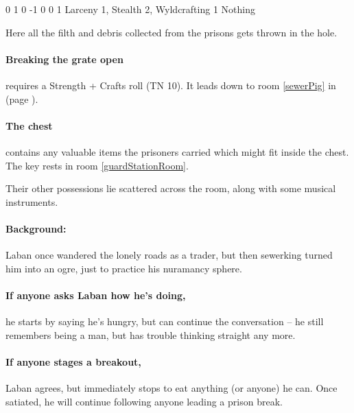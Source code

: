 \begin{multicols}{2}
{0}%
{1}%
{{0}%
{-1}%
{0}}%
{0}%
{1}%
{Larceny 1, Stealth 2, Wyldcrafting 1}%
{Nothing}%
{}


Here all the filth and debris collected from the prisons gets thrown in the hole.

\paragraph{Breaking the grate open}
requires a Strength + Crafts roll (TN 10).
It leads down to room \ref{sewerPig} in \lowercase{} (page \pageref{sewerPig}).


\paragraph{The chest}
contains any valuable items the prisoners carried which might fit inside the chest.
The key rests in room \ref{guardStationRoom}.

Their other possessions lie scattered across the room, along with some musical instruments.


\paragraph{Background:}
Laban once wandered the lonely roads as a trader, but then \Gls{sewerking} turned him into an ogre, just to practice his nuramancy sphere.

\paragraph{If anyone asks Laban how he's doing,}
he starts by saying he's hungry, but can continue the conversation -- he still remembers being a man, but has trouble thinking straight any more.

\paragraph{If anyone stages a breakout,}
Laban agrees, but immediately stops to eat anything (or anyone) he can.
Once satiated, he will continue following anyone leading a prison break.


\end{multicols}
